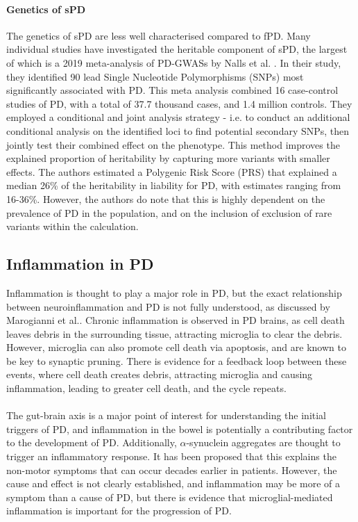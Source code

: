\documentclass{article}
\begin{document}
\paragraph{Genetics of sPD}The genetics of sPD are less well characterised compared to fPD. Many individual studies have investigated the heritable component of sPD, the largest of which is a 2019 meta-analysis of PD-GWASs by Nalls et al. \cite{Nalls2019IdentificationStudies}. In their study, they identified 90 lead Single Nucleotide Polymorphisms (SNPs) most significantly associated with PD. This meta analysis combined 16 case-control studies of PD, with a total of 37.7 thousand cases, and 1.4 million controls. They employed a conditional and joint analysis strategy - i.e.  to conduct an additional conditional analysis on the identified loci to find potential secondary SNPs, then jointly test their combined effect on the phenotype\cite{Yang2012ConditionalTraits}. This method improves the explained proportion of heritability by capturing more variants with smaller effects. The authors estimated a Polygenic Risk Score (PRS) that explained a median 26\% of the heritability in liability for PD, with estimates ranging from 16-36\%. However, the authors do note that this is highly dependent on the prevalence of PD in the population, and on the inclusion of exclusion of rare variants within the calculation.
\subsection{Inflammation in PD}
\label{subsec:inflammation}
Inflammation is thought to play a major role in PD, but the exact relationship between neuroinflammation and PD is not fully understood, as discussed by Marogianni et al.\cite{Marogianni2020NeurodegenerationDisease}. Chronic inflammation is observed in PD brains, as cell death leaves debris in the surrounding tissue, attracting microglia to clear the debris\cite{Pajares2020InflammationImplications}. However, microglia can also promote cell death via apoptosis, and are known to be key to synaptic pruning. There is evidence for a feedback loop between these events, where cell death creates debris, attracting microglia and causing inflammation, leading to greater cell death, and the cycle repeats.
\\
\\The gut-brain axis is a major point of interest for understanding the initial triggers of PD, and inflammation in the bowel is potentially a contributing factor to the development of PD\cite{Marogianni2020NeurodegenerationDisease}.
Additionally, $\alpha$-synuclein aggregates are thought to trigger an inflammatory response. It has been proposed that this explains the non-motor symptoms that can occur decades earlier in patients\cite{Forloni2023AlphaInflammation}. However, the cause and effect is not clearly established, and inflammation may be more of a symptom than a cause of PD\cite{Pajares2020InflammationImplications}, but there is evidence that microglial-mediated inflammation is important for the progression of PD\cite{Isik2023MicrogliaDisease}.
\end{document}
